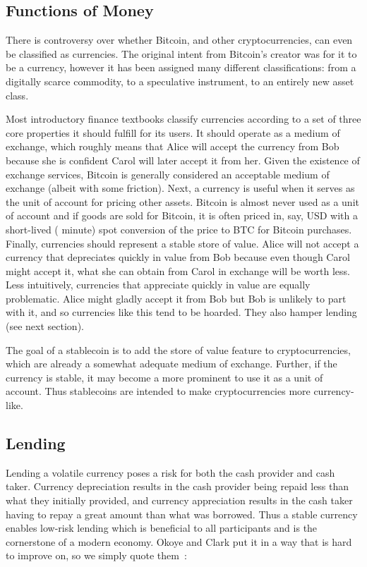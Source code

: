 \subsection{Functions of Money}
 
There is controversy over whether Bitcoin, and other cryptocurrencies, can even be classified as currencies. The original intent from Bitcoin's creator was for it to be a currency, however it has been assigned many different classifications: from a digitally scarce commodity, to a speculative instrument, to an entirely new asset class. 

Most introductory finance textbooks classify currencies according to a set of three core properties it should fulfill for its users. It should operate as a medium of exchange, which roughly means that Alice will accept the currency from Bob because she is confident Carol will later accept it from her. Given the existence of exchange services, Bitcoin is generally considered an acceptable medium of exchange (albeit with some friction). Next, a currency is useful when it serves as the unit of account for pricing other assets. Bitcoin is almost never used as a unit of account and if goods are sold for Bitcoin, it is often priced in, say, USD with a short-lived ( minute) spot conversion of the price to BTC for Bitcoin purchases. Finally, currencies should represent a stable store of value. Alice will not accept a currency that depreciates quickly in value from Bob because even though Carol might accept it, what she can obtain from Carol in exchange will be worth less. Less intuitively, currencies that appreciate quickly in value are equally problematic. Alice might gladly accept it from Bob but Bob is unlikely to part with it, and so currencies like this tend to be hoarded. They also hamper lending (see next section).

The goal of a stablecoin is to add the store of value feature to cryptocurrencies, which are already a somewhat adequate medium of exchange. Further, if the currency is stable, it may become a more prominent to use it as a unit of account. Thus stablecoins are intended to make cryptocurrencies more currency-like.


\subsection{Lending}

Lending a volatile currency poses a risk for both the cash provider and cash taker. Currency depreciation results in the cash provider being repaid less than what they initially provided, and currency appreciation results in the cash taker having to repay a great amount than what was borrowed. Thus a stable currency enables low-risk lending which is beneficial to all participants and is the cornerstone of a modern economy. Okoye and Clark put it in a way that is hard to improve on, so we simply quote them~\cite{okoyetoward}:

